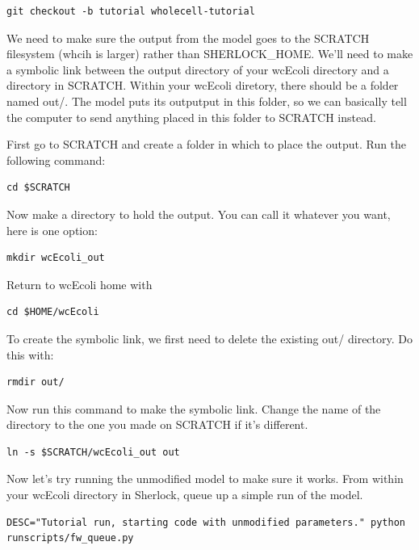 \documentclass[12pt]{article}
\begin{document}
\lstset{language=bash}
\begin{lstlisting}
git checkout -b tutorial wholecell-tutorial
\end{lstlisting}

We need to make sure the output from the model goes to the SCRATCH filesystem (whcih is larger) rather than SHERLOCK\_HOME. We'll need to make a symbolic link between the output directory of your wcEcoli directory and a directory in SCRATCH. Within your wcEcoli diretory, there should be a folder named out/. The model puts its outputput in this folder, so we can basically tell the computer to send anything placed in this folder to SCRATCH instead.

First go to SCRATCH and create a folder in which to place the output. Run the following command:

\lstset{language=bash}
\begin{lstlisting}
cd $SCRATCH
\end{lstlisting}

Now make a directory to hold the output. You can call it whatever you want, here is one option:

\lstset{language=bash}
\begin{lstlisting}
mkdir wcEcoli_out
\end{lstlisting}

Return to wcEcoli home with

\lstset{language=bash}
\begin{lstlisting}
cd $HOME/wcEcoli
\end{lstlisting}

To create the symbolic link, we first need to delete the existing out/ directory. Do this with:

\lstset{language=bash}
\begin{lstlisting}
rmdir out/
\end{lstlisting}

Now run this command to make the symbolic link. Change the name of the directory to the one you made on SCRATCH if it's different.

\lstset{language=bash}
\begin{lstlisting}
ln -s $SCRATCH/wcEcoli_out out
\end{lstlisting}


Now let's try running the unmodified model to make sure it works. From within your wcEcoli directory in Sherlock, queue up a simple run of the model.

\lstset{language=bash}
\begin{lstlisting}
DESC="Tutorial run, starting code with unmodified parameters." python runscripts/fw_queue.py
\end{lstlisting}
\end{document}
